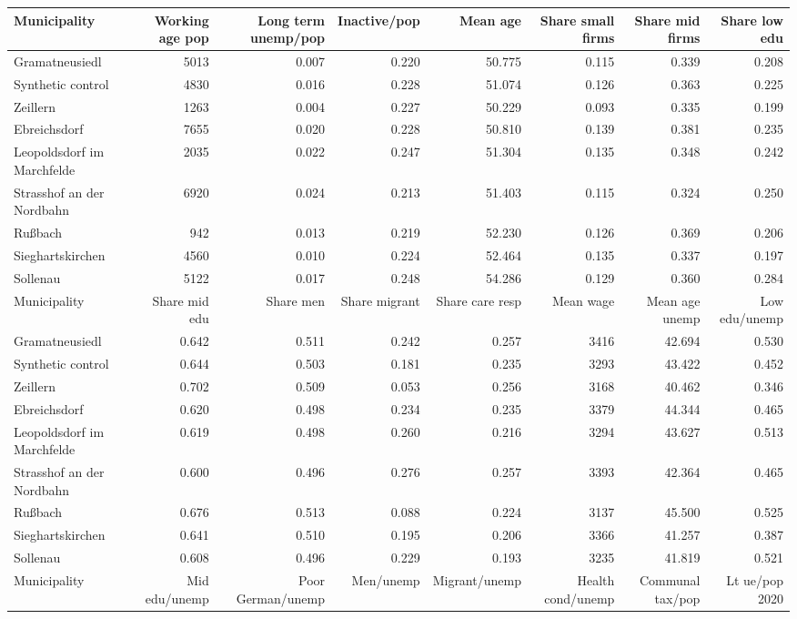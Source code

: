 
\begin{tabular}{lrrrrrrr}
\toprule
Municipality & Working age pop & Long term unemp/pop & Inactive/pop & Mean age & Share small firms & Share mid firms & Share low edu\\
\midrule
Gramatneusiedl & 5013 & 0.007 & 0.220 & 50.775 & 0.115 & 0.339 & 0.208\\
Synthetic control & 4830 & 0.016 & 0.228 & 51.074 & 0.126 & 0.363 & 0.225\\
\addlinespace
Zeillern & 1263 & 0.004 & 0.227 & 50.229 & 0.093 & 0.335 & 0.199\\
Ebreichsdorf & 7655 & 0.020 & 0.228 & 50.810 & 0.139 & 0.381 & 0.235\\
Leopoldsdorf im Marchfelde & 2035 & 0.022 & 0.247 & 51.304 & 0.135 & 0.348 & 0.242\\
Strasshof an der Nordbahn & 6920 & 0.024 & 0.213 & 51.403 & 0.115 & 0.324 & 0.250\\
Rußbach & 942 & 0.013 & 0.219 & 52.230 & 0.126 & 0.369 & 0.206\\
Sieghartskirchen & 4560 & 0.010 & 0.224 & 52.464 & 0.135 & 0.337 & 0.197\\
Sollenau & 5122 & 0.017 & 0.248 & 54.286 & 0.129 & 0.360 & 0.284\\
\bottomrule
\toprule
Municipality & Share mid edu & Share men & Share migrant & Share care resp & Mean wage & Mean age unemp & Low edu/unemp\\
\midrule
Gramatneusiedl & 0.642 & 0.511 & 0.242 & 0.257 & 3416 & 42.694 & 0.530\\
Synthetic control & 0.644 & 0.503 & 0.181 & 0.235 & 3293 & 43.422 & 0.452\\
\addlinespace
Zeillern & 0.702 & 0.509 & 0.053 & 0.256 & 3168 & 40.462 & 0.346\\
Ebreichsdorf & 0.620 & 0.498 & 0.234 & 0.235 & 3379 & 44.344 & 0.465\\
Leopoldsdorf im Marchfelde & 0.619 & 0.498 & 0.260 & 0.216 & 3294 & 43.627 & 0.513\\
Strasshof an der Nordbahn & 0.600 & 0.496 & 0.276 & 0.257 & 3393 & 42.364 & 0.465\\
Rußbach & 0.676 & 0.513 & 0.088 & 0.224 & 3137 & 45.500 & 0.525\\
Sieghartskirchen & 0.641 & 0.510 & 0.195 & 0.206 & 3366 & 41.257 & 0.387\\
Sollenau & 0.608 & 0.496 & 0.229 & 0.193 & 3235 & 41.819 & 0.521\\
\bottomrule
\toprule
Municipality & Mid edu/unemp & Poor German/unemp & Men/unemp & Migrant/unemp & Health cond/unemp & Communal tax/pop & Lt ue/pop 2020\\

\end{tabular}
